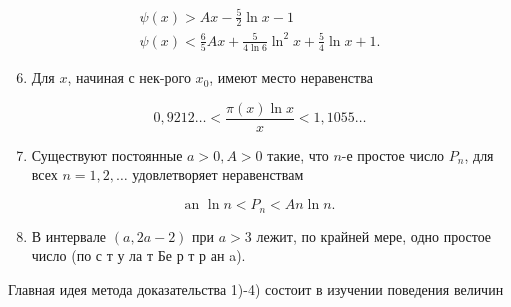 \documentclass[10pt]{article}
\begin{document}
\[

\begin{gathered}

\psi(x)>A x-\frac{5}{2} \ln x-1 \\

\psi(x)<\frac{6}{5} A x+\frac{5}{4 \ln 6} \ln ^{2} x+\frac{5}{4} \ln x+1 .

\end{gathered}

\]



\begin{enumerate}

  \setcounter{enumi}{5}

  \item Для $x$, начиная с нек-рого $x_{0}$, имеют место неравенства

\end{enumerate}



\[

0,9212 \ldots<\frac{\pi(x) \ln x}{x}<1,1055 \ldots

\]



\begin{enumerate}

  \setcounter{enumi}{6}

  \item Существуют постоянные $a>0, A>0$ такие, что $n$-е простое число $P_{n}$, для всех $n=1,2, \ldots$ удовлетворяет неравенствам

\end{enumerate}



\[

\text { an } \ln n<P_{n}<A n \ln n \text {. }

\]



\begin{enumerate}

  \setcounter{enumi}{7}

  \item В интервале $(a, 2 a-2)$ при $a>3$ лежит, по крайней мере, одно простое число (по с т у ла т Бе р т р ан a).

\end{enumerate}



Главная идея метода доказательства 1)-4) состоит в изучении поведения величин
\end{document}
